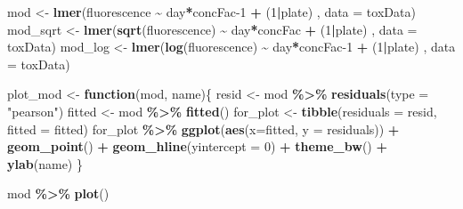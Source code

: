 \documentclass[
]{article}
\newenvironment{Shaded}{\begin{snugshade}}{\end{snugshade}}
\newcommand{\AttributeTok}[1]{\textcolor[rgb]{0.13,0.29,0.53}{#1}}
\newcommand{\ControlFlowTok}[1]{\textcolor[rgb]{0.13,0.29,0.53}{\textbf{#1}}}
\newcommand{\DecValTok}[1]{\textcolor[rgb]{0.00,0.00,0.81}{#1}}
\newcommand{\FunctionTok}[1]{\textcolor[rgb]{0.13,0.29,0.53}{\textbf{#1}}}
\newcommand{\NormalTok}[1]{#1}
\newcommand{\OtherTok}[1]{\textcolor[rgb]{0.56,0.35,0.01}{#1}}
\newcommand{\SpecialCharTok}[1]{\textcolor[rgb]{0.81,0.36,0.00}{\textbf{#1}}}
\newcommand{\StringTok}[1]{\textcolor[rgb]{0.31,0.60,0.02}{#1}}
\begin{document}
\begin{Shaded}
\begin{Highlighting}[]
\NormalTok{mod }\OtherTok{\textless{}{-}} \FunctionTok{lmer}\NormalTok{(fluorescence }\SpecialCharTok{\textasciitilde{}}\NormalTok{ day}\SpecialCharTok{*}\NormalTok{concFac}\DecValTok{{-}1} \SpecialCharTok{+}\NormalTok{ (}\DecValTok{1}\SpecialCharTok{|}\NormalTok{plate) , }\AttributeTok{data =}\NormalTok{ toxData)}
\NormalTok{mod\_sqrt }\OtherTok{\textless{}{-}} \FunctionTok{lmer}\NormalTok{(}\FunctionTok{sqrt}\NormalTok{(fluorescence) }\SpecialCharTok{\textasciitilde{}}\NormalTok{ day}\SpecialCharTok{*}\NormalTok{concFac }\SpecialCharTok{+}\NormalTok{ (}\DecValTok{1}\SpecialCharTok{|}\NormalTok{plate) , }\AttributeTok{data =}\NormalTok{ toxData)}
\NormalTok{mod\_log }\OtherTok{\textless{}{-}} \FunctionTok{lmer}\NormalTok{(}\FunctionTok{log}\NormalTok{(fluorescence) }\SpecialCharTok{\textasciitilde{}}\NormalTok{ day}\SpecialCharTok{*}\NormalTok{concFac}\DecValTok{{-}1} \SpecialCharTok{+}\NormalTok{ (}\DecValTok{1}\SpecialCharTok{|}\NormalTok{plate) , }\AttributeTok{data =}\NormalTok{ toxData)}
\end{Highlighting}
\end{Shaded}

\begin{Shaded}
\begin{Highlighting}[]
\NormalTok{plot\_mod }\OtherTok{\textless{}{-}} \ControlFlowTok{function}\NormalTok{(mod, name)\{}
\NormalTok{  resid }\OtherTok{\textless{}{-}}\NormalTok{ mod }\SpecialCharTok{\%\textgreater{}\%} \FunctionTok{residuals}\NormalTok{(}\AttributeTok{type =} \StringTok{"pearson"}\NormalTok{)}
\NormalTok{  fitted }\OtherTok{\textless{}{-}}\NormalTok{ mod }\SpecialCharTok{\%\textgreater{}\%} \FunctionTok{fitted}\NormalTok{()}
\NormalTok{  for\_plot }\OtherTok{\textless{}{-}} \FunctionTok{tibble}\NormalTok{(}\AttributeTok{residuals =}\NormalTok{ resid, }\AttributeTok{fitted =}\NormalTok{ fitted)}
\NormalTok{  for\_plot }\SpecialCharTok{\%\textgreater{}\%} \FunctionTok{ggplot}\NormalTok{(}\FunctionTok{aes}\NormalTok{(}\AttributeTok{x=}\NormalTok{fitted, }\AttributeTok{y =}\NormalTok{ residuals)) }\SpecialCharTok{+} \FunctionTok{geom\_point}\NormalTok{() }\SpecialCharTok{+} \FunctionTok{geom\_hline}\NormalTok{(}\AttributeTok{yintercept =} \DecValTok{0}\NormalTok{) }\SpecialCharTok{+} \FunctionTok{theme\_bw}\NormalTok{() }\SpecialCharTok{+} \FunctionTok{ylab}\NormalTok{(name)}
\NormalTok{\}}

\NormalTok{mod }\SpecialCharTok{\%\textgreater{}\%} \FunctionTok{plot}\NormalTok{()}
\end{Highlighting}
\end{Shaded}
\end{document}
